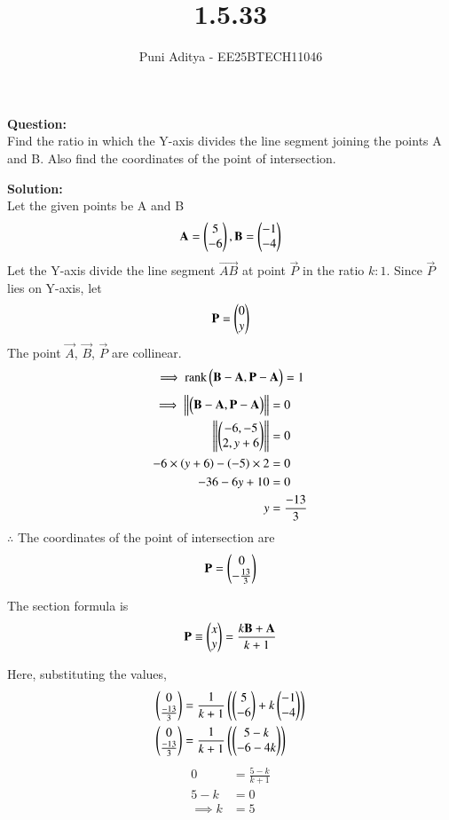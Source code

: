 \documentclass[journal]{IEEEtran}
\begin{document}
\title{1.5.33}
\author{Puni Aditya - EE25BTECH11046}
\maketitle

\textbf{Question:}\\
Find the ratio in which the Y-axis divides the line segment joining the points A and B. Also find the coordinates of the point of intersection.

\textbf{Solution:}\\
Let the given points be A and B
\begin{align*} \mathbf{A} = \begin{pmatrix}5 \\ -6\end{pmatrix}, \mathbf{B} = \begin{pmatrix}-1 \\ -4\end{pmatrix} \end{align*}
Let the Y-axis divide the line segment $\vec{AB}$ at point $\vec{P}$ in the ratio $k:1$.
Since $\vec{P}$ lies on Y-axis, let
\begin{align*}
\mathbf{P} = \begin{pmatrix}0 \\ y\end{pmatrix}
\end{align*}
The point $\vec{A}$, $\vec{B}$, $\vec{P}$ are collinear.
\begin{align}
\implies \text{rank}\begin{pmatrix}\mathbf{B}-\mathbf{A} , \mathbf{P}-\mathbf{A}\end{pmatrix} = 1
\end{align}
\begin{align}
\implies \left\lVert\begin{pmatrix}\mathbf{B}-\mathbf{A} , \mathbf{P}-\mathbf{A}\end{pmatrix}\right\rVert &= 0 \\
\left\lVert\begin{pmatrix}-6 , -5 \\ 2 , y+6\end{pmatrix}\right\rVert &= 0 \\
-6 \times \left(y+6\right) - \left(-5\right) \times 2 &= 0 \\
-36 - 6y + 10 &= 0 \\
y &= \frac{-13}{3}
\end{align}
$\therefore$ The coordinates of the point of intersection are 
\begin{align*}
\mathbf{P} = \begin{pmatrix}0 \\ -\frac{13}{3}\end{pmatrix}
\end{align*}

The section formula is
\begin{align}
    \mathbf{P} \equiv \begin{pmatrix}x \\ y\end{pmatrix} = \frac{k\mathbf{B} + \mathbf{A}}{k+1}
\end{align}

Here, substituting the values,
\begin{align}
    \begin{pmatrix}0 \\ \frac{-13}{3}\end{pmatrix} &= \frac{1}{k+1}\left(\begin{pmatrix}5 \\ -6\end{pmatrix}+k\begin{pmatrix}-1 \\ -4\end{pmatrix}\right) \\
    \begin{pmatrix}0 \\ \frac{-13}{3}\end{pmatrix} &= \frac{1}{k+1}\left(\begin{pmatrix}5-k \\ -6-4k\end{pmatrix}\right) \\
\end{align}
\begin{align}
0 &= \frac{5-k}{k+1} \\
5-k &= 0 \\
\implies k &= 5
\end{align}
\end{document}
